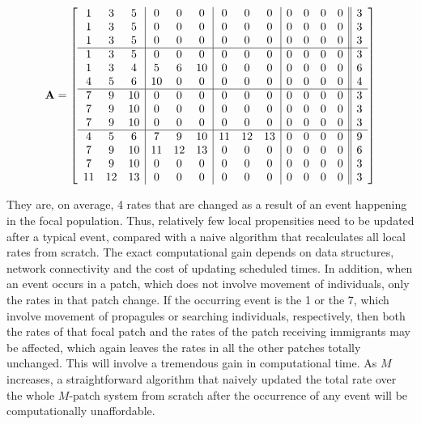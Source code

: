 \begin{equation}
{\bf A} = 
\left[ \begin{array}{ccc|ccc|ccc|cccc||c}
1 & 3 & 5   & 0 & 0 & 0  & 0 & 0 & 0  & 0 & 0 & 0 & 0 & 3\\
1 & 3 & 5   & 0 & 0 & 0  & 0 & 0 & 0  & 0 & 0 & 0 & 0 & 3\\
1 & 3 & 5   & 0 & 0 & 0  & 0 & 0 & 0  & 0 & 0 & 0 & 0 & 3\\
\hline
1 & 3 & 5   & 0  & 0 & 0   & 0 & 0 & 0  & 0 & 0 & 0 & 0 & 3\\
1 & 3 & 4   & 5  & 6 & 10  & 0 & 0 & 0  & 0 & 0 & 0 & 0 & 6\\
4 & 5 & 6   & 10 & 0 & 0   & 0 & 0 & 0  & 0 & 0 & 0 & 0 & 4\\
\hline
7 & 9 & 10  & 0 & 0 & 0  & 0 & 0 & 0  & 0 & 0 & 0 & 0 & 3\\
7 & 9 & 10  & 0 & 0 & 0  & 0 & 0 & 0  & 0 & 0 & 0 & 0 & 3\\
7 & 9 & 10  & 0 & 0 & 0  & 0 & 0 & 0  & 0 & 0 & 0 & 0 & 3\\
\hline
4  & 5  & 6   & 7  & 9  & 10  & 11 & 12 & 13  & 0 & 0 & 0 & 0 & 9\\
7  & 9  & 10  & 11 & 12 & 13  & 0 & 0 & 0     & 0 & 0 & 0 & 0 & 6\\
7  & 9  & 10  & 0  & 0  & 0   & 0 & 0 & 0     & 0 & 0 & 0 & 0 & 3\\
11 & 12 & 13  & 0  & 0  & 0   & 0 & 0 & 0     & 0 & 0 & 0 & 0 & 3\\
\end{array}
\right]
\label{A_E}
\end{equation}

They are, on average, 4 rates that are changed as a result of an event happening in the focal population. Thus, relatively few local propensities need to be updated after a typical event, compared with a naive algorithm that recalculates all local rates from scratch. The exact computational gain depends on data structures, network connectivity and the cost of updating scheduled times. In addition, when an event occurs in a patch, which does not involve movement of individuals, only the rates in that patch change. If the occurring event is the 1 or the 7, which involve movement of propagules or searching individuals, respectively, then both the rates of that focal patch and the rates of the patch receiving immigrants may be affected, which again leaves the rates in all the other patches totally unchanged. This will involve a tremendous gain in computational time. As $M$ increases, a straightforward algorithm that naively updated the total rate over the whole $M$-patch system from scratch after the occurrence of any event will be computationally unaffordable.   
  
